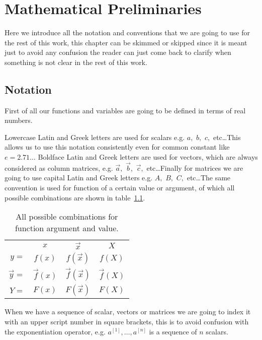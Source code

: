 \documentclass{sapthesis}
\begin{document}
\chapter{Mathematical Preliminaries}

Here we introduce all the notation and conventions that we are going to use for
the rest of this work, this chapter can be skimmed or skipped since it is meant
just to avoid any confusion the reader can just come back to clarify when
something is not clear in the rest of this work.

\section{Notation}

First of all our functions and variables are going to be defined in terms of
real numbers.

Lowercase Latin and Greek letters are used for scalars e.g. \(a,\) \(b,\)
\(c,\) etc\dots This allows us to use this notation consistently even for common
constant like \(e = 2.71\ldots\) Boldface Latin and Greek letters are used for
vectors, which are always considered as column matrices, e.g. \(\vec a,\) \(\vec
b,\) \(\vec c,\) etc\dots Finally for matrices we are going to use capital Latin
and Greek letters e.g. \(A,\) \(B,\) \(C,\) etc\dots The same convention is used
for function of a certain value or argument, of which all possible combinations
are shown in table~\ref{tab:valXarg2}.

\begin{table}
\centering
\begin{tabular}{rccc}
    & \(x\)     & \(\vec x\)     & \(X\) \\[2pt]
    \cline{2-4}
    \multicolumn{1}{r|}{\(y =\)} & \(f(x)\) & \(f(\vec x)\) & \(f(X)\) \\
    \multicolumn{1}{r|}{\(\vec y =\)} & \(\vec f(x)\) & \(\vec f(\vec x)\) & \(\vec f(X)\) \\
    \multicolumn{1}{r|}{\(Y =\)} & \(F(x)\) & \(F(\vec x)\) & \(F(X)\)
\end{tabular}
\caption{All possible combinations for function argument and value.}
\label{tab:valXarg2}
\end{table}

When we have a sequence of scalar, vectors or matrices we are going to index it
with an upper script number in square brackets, this is to avoid confusion with
the exponentiation operator, e.g. \(a^{[1]},\ldots,a^{[n]}\) is a sequence of
\(n\) scalars.
\end{document}
